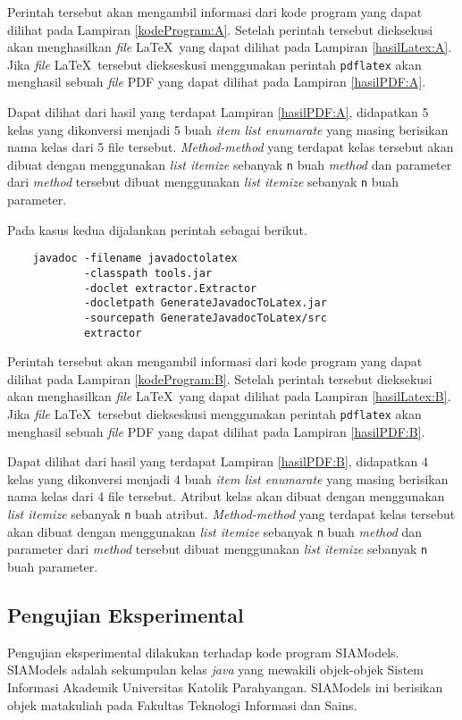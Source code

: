 Perintah tersebut akan mengambil informasi dari kode program yang dapat dilihat pada Lampiran \ref{kodeProgram:A}. Setelah perintah tersebut dieksekusi akan menghasilkan {\it file} \LaTeX\ yang dapat dilihat pada Lampiran \ref{hasilLatex:A}. Jika {\it file} \LaTeX\ tersebut diekseskusi menggunakan perintah {\tt pdflatex} akan menghasil sebuah {\it file} PDF yang dapat dilihat pada Lampiran \ref{hasilPDF:A}.

Dapat dilihat dari hasil yang terdapat Lampiran \ref{hasilPDF:A}, didapatkan 5 kelas yang dikonversi menjadi 5 buah {\it item list enumarate} yang masing berisikan nama kelas dari 5 file tersebut. {\it Method-method} yang terdapat kelas tersebut akan dibuat dengan menggunakan {\it list itemize} sebanyak {\tt n} buah {\it method} dan parameter dari {\it method} tersebut dibuat menggunakan {\it list itemize} sebanyak {\tt n} buah parameter.

Pada kasus kedua dijalankan perintah sebagai berikut.

\begin{verbatim}
	javadoc -filename javadoctolatex
	        -classpath tools.jar
	        -doclet extractor.Extractor
	        -docletpath GenerateJavadocToLatex.jar
	        -sourcepath GenerateJavadocToLatex/src
	        extractor
\end{verbatim}

Perintah tersebut akan mengambil informasi dari kode program yang dapat dilihat pada Lampiran \ref{kodeProgram:B}. Setelah perintah tersebut dieksekusi akan menghasilkan {\it file} \LaTeX\ yang dapat dilihat pada Lampiran \ref{hasilLatex:B}. Jika {\it file} \LaTeX\ tersebut diekseskusi menggunakan perintah {\tt pdflatex} akan menghasil sebuah {\it file} PDF yang dapat dilihat pada Lampiran \ref{hasilPDF:B}.

Dapat dilihat dari hasil yang terdapat Lampiran \ref{hasilPDF:B}, didapatkan 4 kelas yang dikonversi menjadi 4 buah {\it item list enumarate} yang masing berisikan nama kelas dari 4 file tersebut. Atribut kelas akan dibuat dengan menggunakan {\it list itemize} sebanyak {\tt n} buah atribut. {\it Method-method} yang terdapat kelas tersebut akan dibuat dengan menggunakan {\it list itemize} sebanyak {\tt n} buah {\it method} dan parameter dari {\it method} tersebut dibuat menggunakan {\it list itemize} sebanyak {\tt n} buah parameter.

\subsection{Pengujian Eksperimental}
\label{sec:pengujian eksperimental}
Pengujian eksperimental dilakukan terhadap kode program SIAModels. SIAModels adalah sekumpulan kelas {\it java} yang mewakili objek-objek Sistem Informasi Akademik Universitas Katolik Parahyangan. SIAModels ini berisikan objek matakuliah pada Fakultas Teknologi Informasi dan Sains.

